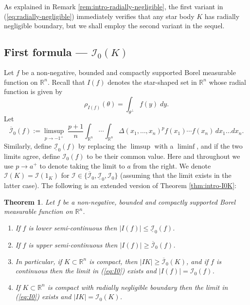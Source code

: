 \documentclass[11pt]{article}
\newtheorem{thm}{Theorem}[section]
\theoremstyle{definition}
\theoremstyle{proof}
\DeclareMathOperator{\+}{\mathop{\tilde{+}}}
\newcommand{\R}{\mathbb{R}}
\newcommand{\I}{\mathcal{I}}
\numberwithin{equation}{section}
\numberwithin{equation}{section}
\begin{document}
As explained in Remark \ref{rem:intro-radially-negligible}, the first variant in (\ref{eq:radially-negligible}) immediately verifies that any star body $K$ has radially negligible boundary, but we shall employ the second variant in the sequel. 

\subsection{First formula --- $\I_0(K)$}

Let $f$ be a non-negative, bounded and compactly supported Borel measurable function on $\R^n$. Recall that $I(f)$ denotes the star-shaped set in $\R^n$ whose radial function is given by
\[
\rho_{I(f)}(\theta) = \int_{\theta^{\perp}} f(y) \;  dy. 
\]
Let
\begin{equation} \label{eq:I0}
\overline{\I}_0(f) := \limsup_{p \rightarrow -1^+} \; \frac{p+1}{n} \int_{\R^n} \cdots \int_{\R^n} \Delta(x_1,\ldots,x_n)^{p} f(x_1) \cdots f(x_n) \, dx_1 \ldots dx_n .
\end{equation}
Similarly, define $\underline{\I}_0(f)$ by replacing the $\limsup$ with a $\liminf$, and if the two limits agree, define $\I_0(f)$ to be their common value. Here and throughout we use $p \rightarrow a^+$ to denote taking the limit to $a$ from the right. We denote $\I(K) = \I(1_K)$ for $\I \in \{ \overline{\I}_0, \underline{\I}_0, \I_0 \}$ (assuming that the limit exists in the latter case). The following is an extended version of Theorem \ref{thm:intro-I0K}:

\begin{thm} \label{thm:I0}
Let $f$ be a non-negative, bounded and compactly supported Borel measurable function on $\R^n$.
\begin{enumerate}
\item If $f$ is lower semi-continuous then $|I(f)| \leq \underline{\I}_0(f)$.
\item If $f$ is upper semi-continuous then $|I(f)| \geq \overline{\I}_0(f)$. 
\item In particular, if $K \subset \R^n$ is compact, then $|I K| \geq \overline{\I}_0(K)$, and if $f$ is continuous then the limit in (\ref{eq:I0}) exists and $|I(f)| = \I_0(f)$. 
\item If $K \subset \R^n$ is compact with radially negligible boundary then the limit in (\ref{eq:I0}) exists and $|IK| = \I_0(K)$. 
\end{enumerate}
\end{thm}
\end{document}
